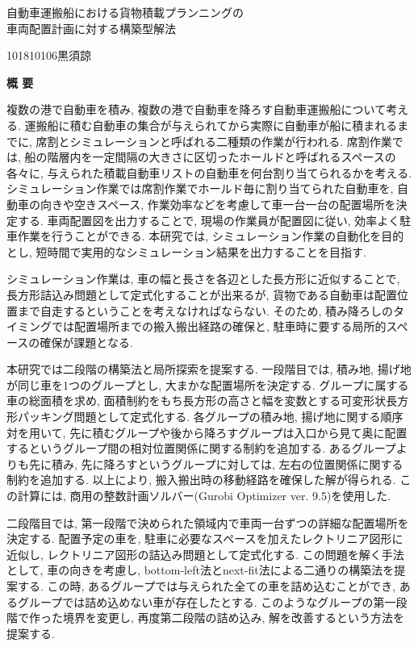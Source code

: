 \begin{center}
\begin{spacing}{1.3}
    {\LARGE 自動車運搬船における貨物積載プランニングの\\車両配置計画に対する構築型解法}\\[0.5cm]
\end{spacing}
\end{center}
\hfill
{\large 101810106\qquad 黒須諒}\\[0.5cm]
\begin{center}
{\Large \bf 概 要}\\
\end{center}

複数の港で自動車を積み, 複数の港で自動車を降ろす自動車運搬船について考える. 
運搬船に積む自動車の集合が与えられてから実際に自動車が船に積まれるまでに, 席割とシミュレーションと呼ばれる二種類の作業が行われる. 
席割作業では, 船の階層内を一定間隔の大きさに区切ったホールドと呼ばれるスペースの各々に, 与えられた積載自動車リストの自動車を何台割り当てられるかを考える. 
シミュレーション作業では席割作業でホールド毎に割り当てられた自動車を, 自動車の向きや空きスペース, 作業効率などを考慮して車一台一台の配置場所を決定する. 
車両配置図を出力することで, 現場の作業員が配置図に従い, 効率よく駐車作業を行うことができる. 
本研究では, シミュレーション作業の自動化を目的とし, 短時間で実用的なシミュレーション結果を出力することを目指す. 

シミュレーション作業は, 車の幅と長さを各辺とした長方形に近似することで, 長方形詰込み問題として定式化することが出来るが, 貨物である自動車は配置位置まで自走するということを考えなければならない. 
そのため, 積み降ろしのタイミングでは配置場所までの搬入搬出経路の確保と, 駐車時に要する局所的スペースの確保が課題となる. 

本研究では二段階の構築法と局所探索を提案する. 
一段階目では, 積み地, 揚げ地が同じ車を1つのグループとし, 大まかな配置場所を決定する. 
グループに属する車の総面積を求め, 面積制約をもち長方形の高さと幅を変数とする可変形状長方形パッキング問題として定式化する. 
各グループの積み地, 揚げ地に関する順序対を用いて, 先に積むグループや後から降ろすグループは入口から見て奥に配置するというグループ間の相対位置関係に関する制約を追加する. 
あるグループよりも先に積み, 先に降ろすというグループに対しては, 左右の位置関係に関する制約を追加する. 
以上により, 搬入搬出時の移動経路を確保した解が得られる. 
この計算には, 商用の整数計画ソルバー(Gurobi Optimizer ver. 9.5)を使用した.  

二段階目では, 第一段階で決められた領域内で車両一台ずつの詳細な配置場所を決定する. 
配置予定の車を, 駐車に必要なスペースを加えたレクトリニア図形に近似し, レクトリニア図形の詰込み問題として定式化する. 
この問題を解く手法として, 車の向きを考慮し, bottom-left法とnext-fit法による二通りの構築法を提案する. 
この時, あるグループでは与えられた全ての車を詰め込むことができ, あるグループでは詰め込めない車が存在したとする. 
このようなグループの第一段階で作った境界を変更し, 再度第二段階の詰め込み, 解を改善するという方法を提案する. 

